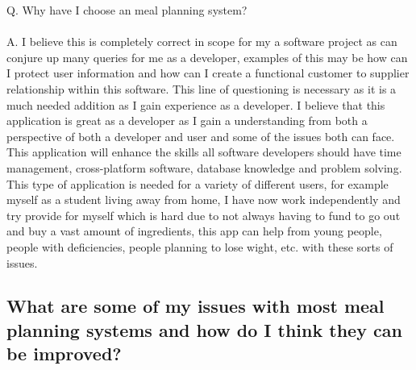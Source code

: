 Q. Why have I choose an meal planning system? \\ \\
A. I believe this is completely correct in scope for my a software project as can conjure up many queries for me as a developer, examples of this may be how can I protect user information and how can I create a functional customer to supplier relationship within this software. This line of questioning is necessary as it is a much needed addition as I gain experience as a developer. I believe that this application is great as a developer as I gain a understanding from both a perspective of both a developer and user and some of the issues both can face. This application will enhance the skills all software developers should have time management, cross-platform software, database knowledge and problem solving. This type of application is needed for a variety of different users, for example myself as a student living away from home, I have now work independently and try provide for myself which is hard due to not always having to fund to go out and buy a vast amount of ingredients, this app can help from young people, people with deficiencies, people planning to lose wight, etc. with these sorts of issues.

\subsection{What are some of my issues with most meal planning systems and how do I think they can be improved?}


